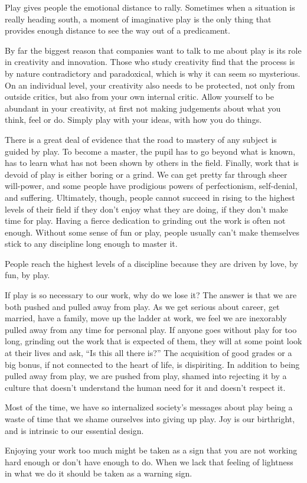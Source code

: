 \documentclass[ebook,12pt,oneside,openany]{memoir}
\begin{document}
Play gives people the emotional distance to rally. Sometimes when a situation is really heading south, a moment of 
imaginative play is the only thing that provides enough distance to see the way out of a predicament.

By far the biggest reason that companies want to talk to me about play is its role in creativity and innovation.
Those who study creativity find that the process is by nature contradictory and paradoxical, which is why it can seem so mysterious.
On an individual level, your creativity also needs to be protected, not only from outside critics, but also from your own internal critic. 
Allow yourself to be abundant in your creativity, at first not making judgements about what you think, feel or do.
Simply play with your ideas, with how you do things.

There is a great deal of evidence that the road to mastery of any subject is guided by play.
To become a master, the pupil has to go beyond what is known, has to learn what has not been shown by others in the field.
Finally, work that is devoid of play is either boring or a grind.
We can get pretty far through sheer will-power, and some people have prodigious powers of perfectionism, self-denial, and suffering.
Ultimately, though, people cannot succeed in rising to the highest levels of their field if they don't enjoy what they are doing, if they don't
make time for play. 
Having a fierce dedication to grinding out the work is often not enough.
Without some sense of fun or play, people usually can't make themselves stick to any discipline long enough to master it.

People reach the highest levels of a discipline because they are driven by love, by fun, by play.

If play is so necessary to our work, why do we lose it? The answer is that we are both 
pushed and pulled away from play. 
As we get serious about career, get married, have a family, move up the ladder at work, we feel we are 
inexorably pulled away from any time for personal play.
If anyone goes without play for too long, grinding out the work that is expected of them, they will
at some point look at their lives and ask, ``Is this all there is?''
The acquisition of good grades or a big bonus, if not connected to the heart of life, is dispiriting.
In addition to being pulled away from play, we are pushed from play, shamed into rejecting it by a culture
that doesn't understand the human need for it and doesn't respect it.

Most of the time, we have so internalized society's messages about play being a waste of time that 
we shame ourselves into giving up play. 
Joy is our birthright, and is intrinsic to our essential design. 

Enjoying your work too much might be taken as a sign that you are not working hard enough or don't have enough to do.
When we lack that feeling of lightness in what we do it should be taken as a warning sign.
\end{document}
